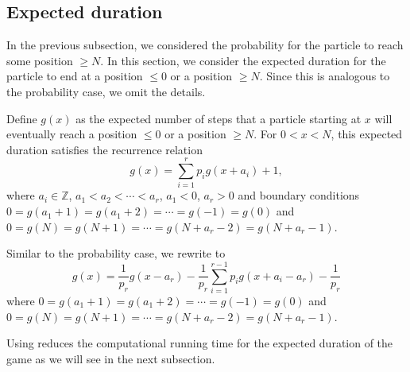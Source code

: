 \documentclass[reqno]{amsart}
\theoremstyle{definition}
\theoremstyle{definition}
\theoremstyle{remark}
\newcommand{\ZZ}{\mathbb{Z}}
\begin{document}
\subsection{Expected duration}\label{subsec:exp}
In the previous subsection, we considered the probability for the particle to reach some position $\geq N$. In this section, we consider the expected duration for the particle to end at a position $\leq 0$ or a position $\geq N$. Since this is analogous to the probability case, we omit the details.


Define $g(x)$ as the expected number of steps that a particle starting at $x$ will eventually reach a position $\leq 0$ or a position $\geq N$. For $0<x<N$, this expected duration satisfies the recurrence relation
\begin{equation}\label{eq:generalexp}
    g(x)=\sum_{i=1}^r p_ig(x+a_i)+1,
\end{equation}
where $a_i\in \ZZ$, $a_1<a_2<\cdots <a_r$, $a_1<0$, $a_r>0$ and boundary conditions $0=g(a_1+1)= g(a_1+2)=\cdots=g(-1)=g(0)$ and $0=g(N)=g(N+1)=\cdots =g(N+a_r-2)=g(N+a_r-1)$.

Similar to the probability case, we rewrite  to 
\begin{equation}\label{eq:bettergeneralexp}
g(x)=\frac{1}{p_r}g(x-a_r)-\frac{1}{p_r}\sum_{i=1}^{r-1}p_ig(x+a_i-a_r)-\frac{1}{p_r}
\end{equation}
where $0=g(a_1+1)= g(a_1+2)=\cdots=g(-1)=g(0)$ and $0=g(N)=g(N+1)=\cdots =g(N+a_r-2)=g(N+a_r-1)$.

Using  reduces the computational running time for the expected duration of the game as we will see in the next subsection.
\end{document}
